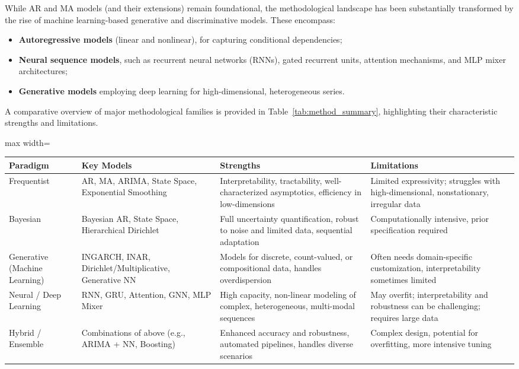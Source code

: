 \documentclass[sigconf]{acmart}
\begin{document}
While AR and MA models (and their extensions) remain foundational, the methodological landscape has been substantially transformed by the rise of machine learning-based generative and discriminative models. These encompass:
\begin{itemize}
    \item \textbf{Autoregressive models} (linear and nonlinear), for capturing conditional dependencies;
    \item \textbf{Neural sequence models}, such as recurrent neural networks (RNNs), gated recurrent units, attention mechanisms, and MLP mixer architectures;
    \item \textbf{Generative models} employing deep learning for high-dimensional, heterogeneous series.
\end{itemize}

A comparative overview of major methodological families is provided in Table~\ref{tab:method_summary}, highlighting their characteristic strengths and limitations.

\begin{table*}[htbp]
\centering
\caption{Comparison of principal modeling paradigms for sequential data}
\label{tab:method_summary}
\begin{adjustbox}{max width=\textwidth}
\begin{tabular}{llll}
\toprule
\textbf{Paradigm} & \textbf{Key Models} & \textbf{Strengths} & \textbf{Limitations} \\
\midrule
Frequentist & AR, MA, ARIMA, State Space, Exponential Smoothing & Interpretability, tractability, well-characterized asymptotics, efficiency in low-dimensions & Limited expressivity; struggles with high-dimensional, nonstationary, irregular data \\
Bayesian & Bayesian AR, State Space, Hierarchical Dirichlet & Full uncertainty quantification, robust to noise and limited data, sequential adaptation & Computationally intensive, prior specification required \\
Generative (Machine Learning) & INGARCH, INAR, Dirichlet/Multiplicative, Generative NN & Models for discrete, count-valued, or compositional data, handles overdispersion & Often needs domain-specific customization, interpretability sometimes limited \\
Neural / Deep Learning & RNN, GRU, Attention, GNN, MLP Mixer & High capacity, non-linear modeling of complex, heterogeneous, multi-modal sequences & May overfit; interpretability and robustness can be challenging; requires large data \\
Hybrid / Ensemble & Combinations of above (e.g., ARIMA + NN, Boosting) & Enhanced accuracy and robustness, automated pipelines, handles diverse scenarios & Complex design, potential for overfitting, more intensive tuning \\
\bottomrule
\end{tabular}
\end{adjustbox}
\end{table*}
\end{document}
